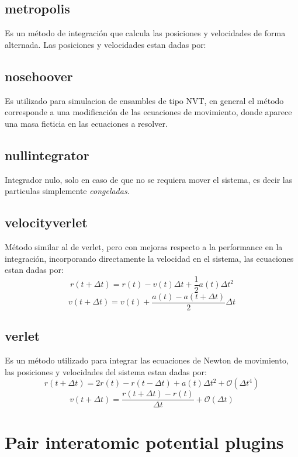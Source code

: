 \subsection{metropolis}
Es un m\'etodo de integraci\'on que calcula las posiciones y velocidades de
forma alternada. Las posiciones y velocidades estan dadas por:

\subsection{nosehoover}
Es utilizado para simulacion de ensambles de tipo NVT, en general el m\'etodo
corresponde a una modificaci\'on de las ecuaciones de movimiento, donde aparece
una masa ficticia en las ecuaciones a resolver.

\subsection{nullintegrator}
Integrador nulo, solo en caso de que no se requiera mover el sistema, es decir
las particulas simplemente \textit{congeladas}.

\subsection{velocityverlet}
M\'etodo similar al de verlet, pero con mejoras respecto a la performance en la
integraci\'on, incorporando directamente la velocidad en el sistema, las
ecuaciones estan dadas por:
$$r(t+\Delta t) = r(t) - v(t)\Delta t + \frac{1}{2}a(t)\Delta t^2$$
$$v(t+\Delta t) = v(t) + \frac{a(t) - a(t + \Delta t)}{2}\Delta t$$

\subsection{verlet}
Es un m\'etodo utilizado para integrar las ecuaciones de Newton de movimiento,
las posiciones y velocidades del sistema estan dadas por:
$$r(t+\Delta t) = 2r(t) - r(t-\Delta t) + a(t)\Delta t^2 + \mathcal{O}(\Delta t^4)$$
$$v(t+\Delta t) = \frac{r(t+\Delta t) - r(t)}{\Delta t} + \mathcal{O}(\Delta t)$$



\section{Pair interatomic potential plugins}
